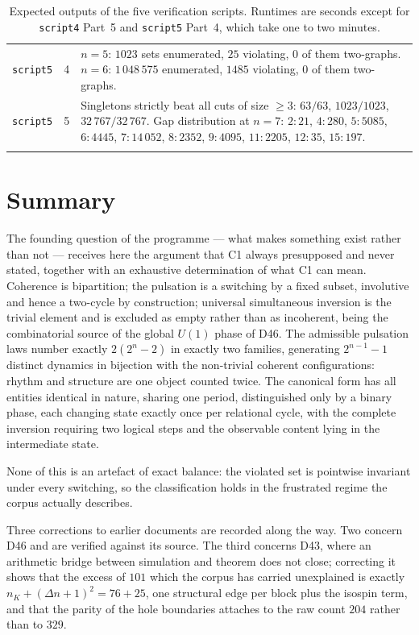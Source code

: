 \documentclass[11pt,a4paper]{article}
\def\mathrm#1{#1}%
\begin{document}
\begin{longtable}{p{2.1cm}p{2.0cm}p{9.8cm}}
\texttt{script5} & 4 & $n=5$: $1023$ sets enumerated, $25$ violating, $0$ of them two-graphs. $n=6$: $1\,048\,575$ enumerated, $1485$ violating, $0$ of them two-graphs. \\
\texttt{script5} & 5 & Singletons strictly beat all cuts of size $\ge3$: $63/63$, $1023/1023$, $32\,767/32\,767$. Gap distribution at $n=7$: $2{:}21$, $4{:}280$, $5{:}5085$, $6{:}4445$, $7{:}14\,052$, $8{:}2352$, $9{:}4095$, $11{:}2205$, $12{:}35$, $15{:}197$. \\
\bottomrule
\caption{Expected outputs of the five verification scripts. Runtimes are seconds except for \texttt{script4} Part~5 and \texttt{script5} Part~4, which take one to two minutes.}
\label{tab:expected}
\end{longtable}

\section{Summary}
\label{sec:summary}

The founding question of the programme --- what makes something exist rather than not --- receives here the argument that C1 always presupposed and never stated, together with an exhaustive determination of what C1 can mean. Coherence is bipartition; the pulsation is a switching by a fixed subset, involutive and hence a two-cycle by construction; universal simultaneous inversion is the trivial element and is excluded as empty rather than as incoherent, being the combinatorial source of the global $\mathrm{U}(1)$ phase of D46. The admissible pulsation laws number exactly $2(2^n-2)$ in exactly two families, generating $2^{n-1}-1$ distinct dynamics in bijection with the non-trivial coherent configurations: rhythm and structure are one object counted twice. The canonical form has all entities identical in nature, sharing one period, distinguished only by a binary phase, each changing state exactly once per relational cycle, with the complete inversion requiring two logical steps and the observable content lying in the intermediate state.

None of this is an artefact of exact balance: the violated set is pointwise invariant under every switching, so the classification holds in the frustrated regime the corpus actually describes.

Three corrections to earlier documents are recorded along the way. Two concern D46 and are verified against its source. The third concerns D43, where an arithmetic bridge between simulation and theorem does not close; correcting it shows that the excess of $101$ which the corpus has carried unexplained is exactly $n_K+(\Delta n+1)^2=76+25$, one structural edge per block plus the isospin term, and that the parity of the hole boundaries attaches to the raw count $204$ rather than to $329$.
\end{document}
